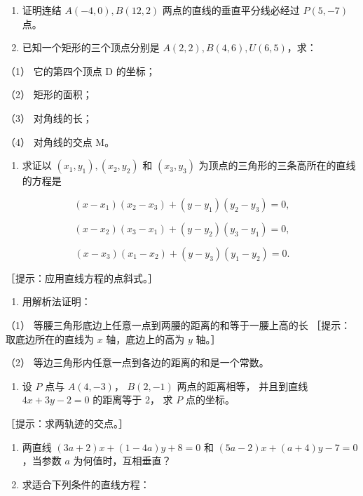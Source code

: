 \begin{enumerate}
\def\labelenumi{\arabic{enumi}.}
\item
  证明连结 \(A(-4,0), B(12,2)\) 两点的直线的垂直平分线必经过 \(P(5,-7)\)
  点。
\item
  已知一个矩形的三个顶点分别是 \(A(2, 2), B(4, 6), U(6, 5)\)，求：
\end{enumerate}

（1） 它的第四个顶点 D 的坐标；

（2） 矩形的面积；

（3） 对角线的长；

（4） 对角线的交点 M。

\begin{enumerate}
\def\labelenumi{\arabic{enumi}.}
\setcounter{enumi}{2}
\tightlist
\item
  求证以 \((x_{1}, y_{1}), (x_{2}, y_{2})\) 和 \((x_{3}, y_{3})\)
  为顶点的三角形的三条高所在的直线的方程是
\end{enumerate}

\[
(x - x_{1}) (x_{2} - x_{3}) + (y - y_{1}) (y_{2} - y_{3}) = 0,
\]

\[
(x - x_{2}) (x_{3} - x_{1}) + (y - y_{2}) (y_{3} - y_{1}) = 0,
\]

\[
(x - x_{3}) (x_{1} - x_{2}) + (y - y_{3}) (y_{1} - y_{2}) = 0.
\]

［提示：应用直线方程的点斜式。］

\begin{enumerate}
\def\labelenumi{\arabic{enumi}.}
\setcounter{enumi}{3}
\tightlist
\item
  用解析法证明：
\end{enumerate}

（1） 等腰三角形底边上任意一点到两腰的距离的和等于一腰上高的长
［提示：取底边所在的直线为 \(x\) 轴，底边上的高为 \(y\) 轴。］

（2） 等边三角形内任意一点到各边的距离的和是一个常数。

\begin{enumerate}
\def\labelenumi{\arabic{enumi}.}
\setcounter{enumi}{4}
\tightlist
\item
  设 \(P\) 点与 \(A(4, -3)\)， \(B(2, -1)\) 两点的距离相等， 并且到直线
  \(4x + 3y - 2 = 0\) 的距离等于 2， 求 \(P\) 点的坐标。
\end{enumerate}

［提示：求两轨迹的交点。］

\begin{enumerate}
\def\labelenumi{\arabic{enumi}.}
\setcounter{enumi}{5}
\item
  两直线 \((3a + 2)x + (1 - 4a)y + 8 = 0\) 和
  \((5a - 2)x + (a + 4)y - 7 = 0\)，当参数 \(a\) 为何值时，互相垂直？
\item
  求适合下列条件的直线方程：
\end{enumerate}

